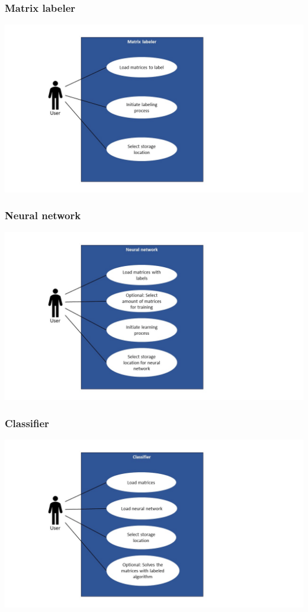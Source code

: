 \documentclass[parskip=full]{scrartcl}
\begin{document}
\subsubsection{Matrix labeler}
\includegraphics[width=1.3\textwidth]{useCase_Labeler}
\subsubsection{Neural network}
\includegraphics[width=1.3\textwidth]{useCase_NeuralNetwork}
\subsubsection{Classifier}
\includegraphics[width=1.3\textwidth]{useCase_Classifier}
\end{document}
